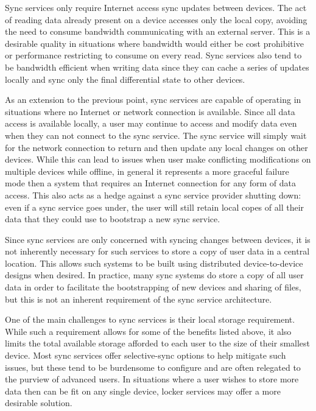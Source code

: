\begin{packed_desc}
\item[Bandwidth Efficient:] Sync services only require Internet access
  sync updates between devices. The act of reading data already
  present on a device accesses only the local copy, avoiding the need
  to consume bandwidth communicating with an external server. This is
  a desirable quality in situations where bandwidth would either be
  cost prohibitive or performance restricting to consume on every
  read. Sync services also tend to be bandwidth efficient when writing
  data since they can cache a series of updates locally and sync only
  the final differential state to other devices.
\item[Offline Support:] As an extension to the previous point, sync
  services are capable of operating in situations where no Internet or
  network connection is available. Since all data access is available
  locally, a user may continue to access and modify data even when
  they can not connect to the sync service. The sync service will
  simply wait for the network connection to return and then update any
  local changes on other devices. While this can lead to issues when
  user make conflicting modifications on multiple devices while
  offline, in general it represents a more graceful failure mode then
  a system that requires an Internet connection for any form of data
  access. This also acts as a hedge against a sync service provider
  shutting down: even if a sync service goes under, the user will
  still retain local copes of all their data that they could use to
  bootstrap a new sync service.
\item[No Central Storage:] Since sync services are only concerned with
  syncing changes between devices, it is not inherently necessary for
  such services to store a copy of user data in a central
  location. This allows such systems to be built using distributed
  device-to-device designs when desired. In practice, many sync
  systems do store a copy of all user data in order to facilitate the
  bootstrapping of new devices and sharing of files, but this is not
  an inherent requirement of the sync service architecture.
\end{packed_desc}

One of the main challenges to sync services is their local storage
requirement. While such a requirement allows for some of the benefits
listed above, it also limits the total available storage afforded to
each user to the size of their smallest device. Most sync services
offer selective-sync options to help mitigate such issues, but these
tend to be burdensome to configure and are often relegated to the
purview of advanced users. In situations where a user wishes to store
more data then can be fit on any single device, locker services may
offer a more desirable solution.

